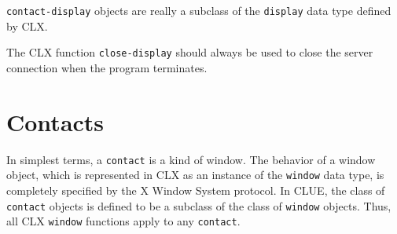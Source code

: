 {\tt contact-display} objects are really a subclass of the {\tt display} data
type defined by CLX\footnotemark{}.

\begin{center}
\end{center}

The CLX function {\tt close-display} should always be used
to close the server connection when the program terminates.

\section{Contacts\label{sec:contacts}}
In simplest terms, a {\tt contact} is a kind of window. The behavior of a window
object,
which is represented in CLX as an instance of the
{\tt window} data type,
is completely specified by the X Window System
protocol.  In CLUE, the class of {\tt contact} objects is defined to be
a subclass of the class of {\tt window} objects\footnotemark{}.  Thus, all CLX {\tt window} functions
apply to any {\tt contact}. 

\begin{center}
\end{center}



